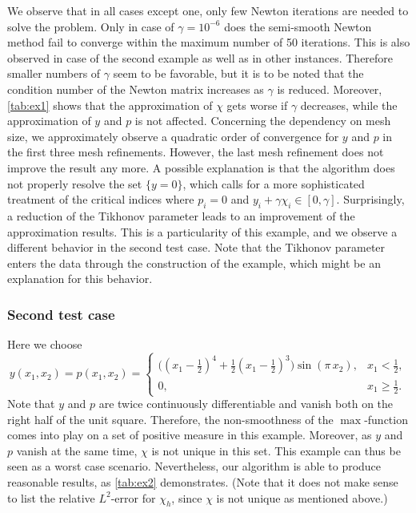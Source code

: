\documentclass[reqno]{shinyart}
\begin{document}
We observe that in all cases except one, only few Newton iterations are needed to solve the 
problem. Only in case of $\gamma = 10^{-6}$ does the semi-smooth Newton method fail to converge 
within the maximum number of 50 iterations. This is also observed in case of the second example as well as  
in other instances. Therefore smaller numbers of $\gamma$ seem to be favorable, but 
it is to be noted that the condition number of the Newton matrix increases as $\gamma$ is reduced.
Moreover, \cref{tab:ex1} shows that the approximation of $\chi$ gets worse if $\gamma$ decreases, 
while the approximation of $y$ and $p$ is not affected. Concerning the dependency on mesh size, 
we approximately observe a quadratic order of convergence for $y$ and $p$
in the first three mesh refinements. However, the last mesh refinement does not improve the 
result any more. A possible explanation is that the algorithm does not properly resolve the 
set $\{y=0\}$, which calls for a more sophisticated treatment of the critical indices 
where $p_i=0$ and $y_i + \gamma \chi_i \in [0,\gamma]$. 
Surprisingly, a reduction of the Tikhonov parameter leads to an improvement of the 
approximation results. This is a particularity of this example, and we observe a different behavior 
in the second test case. Note that the Tikhonov parameter enters the data through the construction 
of the example, which might be an explanation for this behavior.

\subsubsection{Second test case}

Here we choose
\begin{equation*}
    y(x_1,x_2) = p(x_1, x_2)
    = \begin{cases}
        \big((x_1 - \frac{1}{2})^4 + \frac{1}{2}(x_1 - \frac{1}{2})^3\big) \sin(\pi\,x_2) , 
        & x_1 < \frac{1}{2},\\
        0, & x_1 \geq \frac{1}{2}.
    \end{cases}
\end{equation*}
Note that $y$ and $p$ are twice continuously differentiable and vanish both on the 
right half of the unit square. Therefore, the non-smoothness of the $\max$-function
comes into play on a set of positive measure in this example. 
Moreover, as $y$ and $p$ vanish at the same time, $\chi$ is not unique in this set. 
This example can thus be seen as a worst case scenario. Nevertheless, our algorithm 
is able to produce reasonable results, as \cref{tab:ex2} demonstrates. 
(Note that it does not make sense to list the relative $L^2$-error for $\chi_h$, 
since $\chi$ is not unique as mentioned above.)
\end{document}
